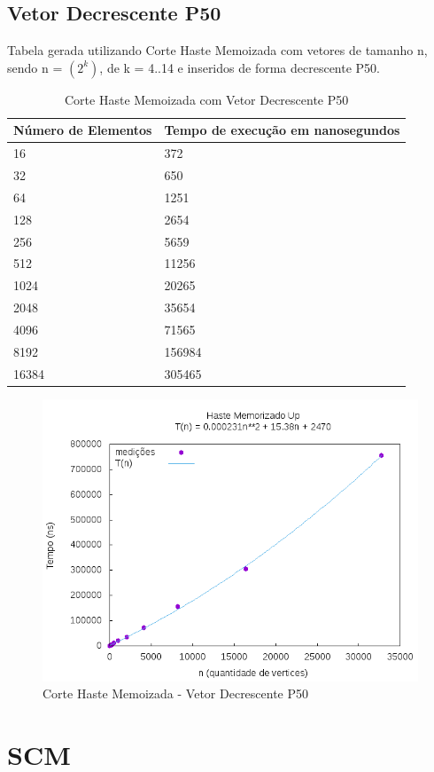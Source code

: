 \documentclass[12pt,a4paper,twoside]{report}
\begin{document}
\subsection{Vetor Decrescente P50}
Tabela gerada utilizando Corte Haste Memoizada com vetores de tamanho n, sendo n = $(2^k)$, de k = 4..14 e inseridos de forma decrescente P50.
\begin{table}[H]
\centering
\caption{Corte Haste Memoizada com Vetor Decrescente P50}
\label{my-label}
\begin{tabular}{|l|l|}
\hline
\multicolumn{1}{|c|}{\textbf{Número de Elementos}} & \multicolumn{1}{c|}{\textbf{Tempo de execução em nanosegundos}} \\ \hline
16 & 372 \\ \hline
32 & 650 \\ \hline
64 & 1251 \\ \hline
128 & 2654 \\ \hline
256 & 5659 \\ \hline
512 & 11256 \\ \hline
1024 & 20265 \\ \hline
2048 & 35654 \\ \hline
4096 & 71565 \\ \hline
8192 & 156984 \\ \hline
16384 & 305465 \\ \hline
\end{tabular}
\end{table}

\begin{figure}[H]
    \centering
    \includegraphics[width=0.7\linewidth]{graficos/CorteHasteMemorizado/Decrescente P50/HasteMemo.png}
  \caption{Corte Haste Memoizada - Vetor Decrescente P50}
\end{figure}

\section{SCM}
\end{document}
